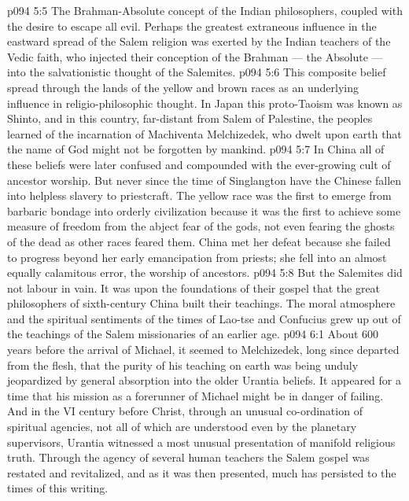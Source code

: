 \vs p094 5:5 \bibnobreakspace The Brahman\hyp{}Absolute concept of the Indian philosophers, coupled with the desire to escape all evil. Perhaps the greatest extraneous influence in the eastward spread of the Salem religion was exerted by the Indian teachers of the Vedic faith, who injected their conception of the Brahman --- the Absolute --- into the salvationistic thought of the Salemites.
\vs p094 5:6 \pc This composite belief spread through the lands of the yellow and brown races as an underlying influence in religio\hyp{}philosophic thought. In Japan this proto\hyp{}Taoism was known as Shinto, and in this country, far\hyp{}distant from Salem of Palestine, the peoples learned of the incarnation of Machiventa Melchizedek, who dwelt upon earth that the name of God might not be forgotten by mankind.
\vs p094 5:7 In China all of these beliefs were later confused and compounded with the ever\hyp{}growing cult of ancestor worship. But never since the time of Singlangton have the Chinese fallen into helpless slavery to priestcraft. The yellow race was the first to emerge from barbaric bondage into orderly civilization because it was the first to achieve some measure of freedom from the abject fear of the gods, not even fearing the ghosts of the dead as other races feared them. China met her defeat because she failed to progress beyond her early emancipation from priests; she fell into an almost equally calamitous error, the worship of ancestors.
\vs p094 5:8 \pc But the Salemites did not labour in vain. It was upon the foundations of their gospel that the great philosophers of sixth\hyp{}century China built their teachings. The moral atmosphere and the spiritual sentiments of the times of Lao\hyp{}tse and Confucius grew up out of the teachings of the Salem missionaries of an earlier age.
\vs p094 6:1 About 600 years before the arrival of Michael, it seemed to Melchizedek, long since departed from the flesh, that the purity of his teaching on earth was being unduly jeopardized by general absorption into the older Urantia beliefs. It appeared for a time that his mission as a forerunner of Michael might be in danger of failing. And in the VI century before Christ, through an unusual co\hyp{}ordination of spiritual agencies, not all of which are understood even by the planetary supervisors, Urantia witnessed a most unusual presentation of manifold religious truth. Through the agency of several human teachers the Salem gospel was restated and revitalized, and as it was then presented, much has persisted to the times of this writing.
